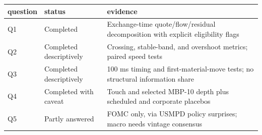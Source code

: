 \begin{tabular}{lll}
\toprule
question & status & evidence \\
\midrule
Q1 & Completed & Exchange-time quote/flow/residual decomposition with explicit eligibility flags \\
Q2 & Completed descriptively & Crossing, stable-band, and overshoot metrics; paired speed tests \\
Q3 & Completed descriptively & 100 ms timing and first-material-move tests; no structural information share \\
Q4 & Completed with caveat & Touch and selected MBP-10 depth plus scheduled and corporate placebos \\
Q5 & Partly answered & FOMC only, via USMPD policy surprises; macro needs vintage consensus \\
\bottomrule
\end{tabular}
